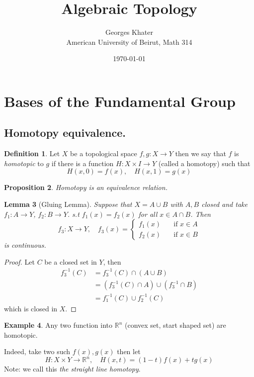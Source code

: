 \documentclass[11pt,a4paper]{article}
\title{\LARGE\bfseries Algebraic Topology}
\author{Georges Khater \\ \small American University of Beirut, Math 314}
\date{\today}
\theoremstyle{definition}
\newtheorem{definition}{Definition}[section]
\newtheorem{example}[definition]{Example}
\theoremstyle{plain}
\newtheorem{lemma}[definition]{Lemma}
\newtheorem{proposition}[definition]{Proposition}
\theoremstyle{remark}
\newcommand{\R}{\mathbb{R}}
\newcommand{\1}{\mathbbm{1}}
\begin{document}
\maketitle
\tableofcontents
\bigskip

\section{Bases of the Fundamental Group}

\subsection{Homotopy equivalence.}
\begin{definition}
    Let $X$ be a topological space $f, g \colon X \to Y$ then we say that $f$ is \emph{homotopic} to $g$ 
    if there is a function $H \colon X \times I \to Y$ (called a homotopy) such that 
    $$H(x, 0) = f(x), \quad H(x, 1) = g(x)$$
\end{definition}

\begin{proposition}
    Homotopy is an equivalence relation. 
\end{proposition}

\begin{lemma}[Gluing Lemma]
    Suppose that $X = A \cup B$ with $A, B$ closed and take $f_1 \colon A \to Y$, $f_2 \colon B \to Y$. 
    s.t $f_1 (x) = f_2(x)$ for all $x \in A \cap B$. Then 
    $$f_3 \colon X \to Y, \quad f_3(x) = \begin{cases}
        f_1(x) \quad &\text{if $x \in A$} \\
        f_2(x) \quad &\text{if $x \in B$}
    \end{cases}$$
    is continuous.   
\end{lemma}

\begin{proof}
    Let $C$ be a closed set in $Y$, then 
    \begin{align*}
        f_3^{-1}(C) &= f_3^{-1}(C) \cap (A \cup B) \\
        &= \left(f_3^{-1}(C) \cap A\right) \cup \left( f_3^{-1} \cap B \right) \\
        &= f_1^{-1} (C) \cup f_2^{-1}(C)   
    \end{align*}
    which is closed in $X$.
\end{proof}

\begin{example}
    Any two function into $\R^n$ (convex set, start shaped set) are homotopic.

    Indeed, take two such $f(x), g(x)$ then let 
    $$H \colon X \times Y \to \R^n, \quad H(x, t) = (1-t) f(x) + t g(x)$$
    Note: we call this \emph{the straight line homotopy}. 
\end{example}
\end{document}
